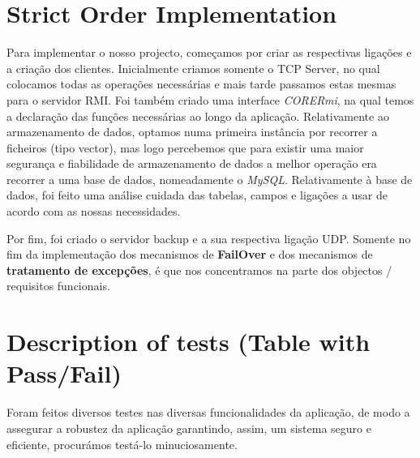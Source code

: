 \documentclass[12pt]{article} %
\begin{document}
\section{Strict Order Implementation}
\label{sec:strict}
Para implementar o nosso projecto, começamos por criar as respectivas ligações e a criação dos clientes. Inicialmente criamos somente o TCP Server, no qual colocamos todas as operações necessárias e mais tarde passamos estas mesmas para o servidor RMI. Foi também criado uma interface \emph{CORERmi}, na qual temos a declaração das funções necessárias ao longo da aplicação.
Relativamente ao armazenamento de dados, optamos numa primeira instância por recorrer a ficheiros (tipo vector), mas logo percebemos que para existir uma maior segurança e fiabilidade de armazenamento de dados a melhor operação era recorrer a uma base de dados, nomeadamente o \emph{MySQL}. Relativamente à base de dados, foi feito uma análise cuidada das tabelas, campos e ligações a usar de acordo com as nossas necessidades.

Por fim, foi criado o servidor backup e a sua respectiva ligação UDP. Somente no fim da implementação dos mecanismos de \textbf{FailOver} e dos mecanismos de \textbf{tratamento de excepções}, é que nos concentramos na parte dos objectos / requisitos funcionais.


\pagebreak
\section{Description of tests (Table with Pass/Fail)} %
\label{sec:Tests}
Foram feitos diversos testes nas diversas funcionalidades da aplicação, de modo a assegurar a robustez da aplicação garantindo, assim, um sistema seguro e eficiente, procurámos testá-lo minuciosamente.

\end{document}

